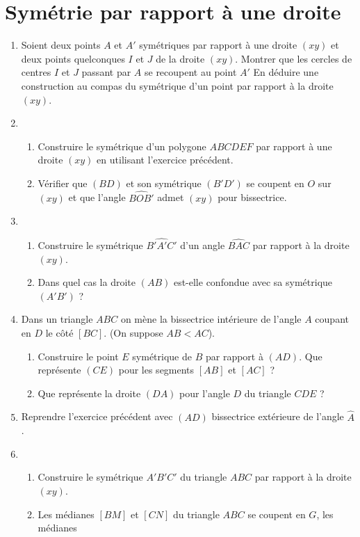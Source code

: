 \documentclass[12 pt]{report}
\theoremstyle{plain}
\newcounter{n}
\begin{document}
\chapter{Symétrie par rapport à une droite}
\begin{enumerate}
\item Soient deux points $A$ et $A'$ symétriques par rapport à une droite $(xy)$ et 
deux points quelconques $I$ et $J$ de la droite $(xy)$. Montrer que les cercles de
centres $I$ et $J$ passant par $A$ se recoupent au point $A'$ En déduire une construction au compas du symétrique d'un point par rapport à la droite $(xy)$. 
\item \begin{enumerate}
\item Construire le symétrique d'un polygone $ABCDEF$ par rapport à une droite $(xy)$
en utilisant l'exercice précédent. 
\item Vérifier que $(BD)$ et son symétrique $(B'D')$ se coupent en $O$ sur $(xy)$ et
que l'angle $\widehat{BOB'}$ admet $(xy)$ pour bissectrice. 
\end{enumerate}
\item \begin{enumerate}
\item Construire le symétrique $\widehat{B'A'C'}$ d'un angle $\widehat{BAC}$ par rapport à la droite $(xy)$.
\item Dans quel cas la droite $(AB)$ est-elle confondue avec sa symétrique $(A'B')$ ?
\end{enumerate}
\item Dans un triangle $ABC$ on mène la bissectrice intérieure de l'angle $A$ coupant en $D$ le côté $[BC]$. (On suppose $AB<AC$). \begin{enumerate}
\item Construire le point $E$ symétrique de $B$ par rapport à $(AD)$. Que 
représente $(CE)$ pour les segments $[AB]$ et $[AC]$ ? 
\item Que représente la droite $(DA)$ pour l'angle $D$ du triangle $CDE$ ? 
\end{enumerate}
\item Reprendre l'exercice précédent avec $(AD)$ bissectrice extérieure de l'angle $\widehat{A}$. 
\item \begin{enumerate}
\item Construire le symétrique $A'B'C'$ du triangle $ABC$ par rapport à la droite $(xy)$. 
\item Les médianes $[BM]$ et $[CN]$ du triangle $ABC$ se coupent en $G$, les médianes

\end{enumerate}
\end{enumerate}
\end{document}
